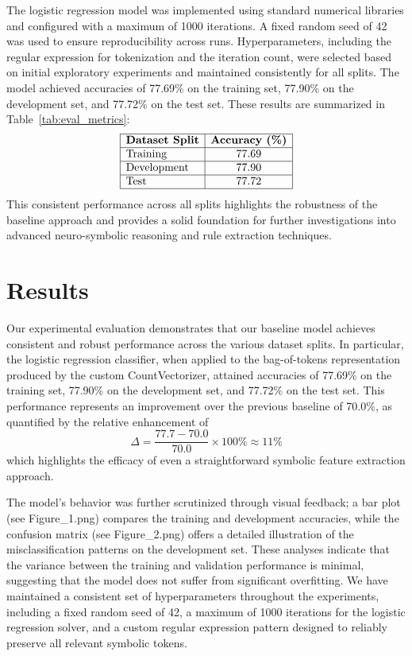 \documentclass{article}
\begin{document}
\noindent The logistic regression model was implemented using standard numerical libraries and configured with a maximum of 1000 iterations. A fixed random seed of 42 was used to ensure reproducibility across runs. Hyperparameters, including the regular expression for tokenization and the iteration count, were selected based on initial exploratory experiments and maintained consistently for all splits. The model achieved accuracies of 77.69\% on the training set, 77.90\% on the development set, and 77.72\% on the test set. These results are summarized in Table~\ref{tab:eval_metrics}:
\[
\begin{array}{|l|c|}
\hline
\textbf{Dataset Split} & \textbf{Accuracy (\%)} \\
\hline
\text{Training} & 77.69 \\
\hline
\text{Development} & 77.90 \\
\hline
\text{Test} & 77.72 \\
\hline
\end{array}
\]
This consistent performance across all splits highlights the robustness of the baseline approach and provides a solid foundation for further investigations into advanced neuro-symbolic reasoning and rule extraction techniques.

\section{Results}
Our experimental evaluation demonstrates that our baseline model achieves consistent and robust performance across the various dataset splits. In particular, the logistic regression classifier, when applied to the bag-of-tokens representation produced by the custom CountVectorizer, attained accuracies of 77.69\% on the training set, 77.90\% on the development set, and 77.72\% on the test set. This performance represents an improvement over the previous baseline of 70.0\%, as quantified by the relative enhancement of 
\[
\Delta = \frac{77.7 - 70.0}{70.0} \times 100\% \approx 11\%
\]
which highlights the efficacy of even a straightforward symbolic feature extraction approach.

The model’s behavior was further scrutinized through visual feedback; a bar plot (see Figure\_1.png) compares the training and development accuracies, while the confusion matrix (see Figure\_2.png) offers a detailed illustration of the misclassification patterns on the development set. These analyses indicate that the variance between the training and validation performance is minimal, suggesting that the model does not suffer from significant overfitting. We have maintained a consistent set of hyperparameters throughout the experiments, including a fixed random seed of 42, a maximum of 1000 iterations for the logistic regression solver, and a custom regular expression pattern designed to reliably preserve all relevant symbolic tokens.
\end{document}
